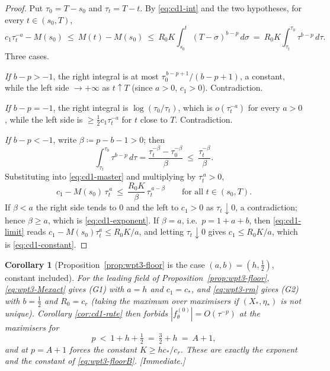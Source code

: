 \documentclass[11pt]{article}
\newtheorem{corollary}[theorem]{Corollary}
\theoremstyle{definition}
\theoremstyle{remark}
\newcommand{\abs}[1]{\left|#1\right|}
\begin{document}
\begin{proof}
  Put $\tau_0=T-s_0$ and $\tau_t=T-t$. By \eqref{eq:cd1-int} and the two
  hypotheses, for every $t\in(s_0,T)$,
  \begin{equation}\label{eq:cd1-master}
    c_1\tau_t^{-a}-M(s_0)\ \leq\ M(t)-M(s_0)
      \ \leq\ R_0K\int_{s_0}^{t}(T-\sigma)^{b-p}\,d\sigma
      \ =\ R_0K\int_{\tau_t}^{\tau_0}\tau^{b-p}\,d\tau .
  \end{equation}
  Three cases.

  \emph{If $b-p>-1$}, the right integral is at most
  $\tau_0^{\,b-p+1}/(b-p+1)$, a constant, while the left side
  $\to+\infty$ as $t\uparrow T$ (since $a>0$, $c_1>0$). Contradiction.

  \emph{If $b-p=-1$}, the right integral is
  $\log(\tau_0/\tau_t)$, which is $o(\tau_t^{-a})$ for every $a>0$, while the
  left side is $\geq\tfrac12c_1\tau_t^{-a}$ for $t$ close to $T$.
  Contradiction.

  \emph{If $b-p<-1$}, write $\beta\coloneqq p-b-1>0$; then
  \[
    \int_{\tau_t}^{\tau_0}\tau^{b-p}\,d\tau
      =\frac{\tau_t^{-\beta}-\tau_0^{-\beta}}{\beta}
      \ \leq\ \frac{\tau_t^{-\beta}}{\beta}.
  \]
  Substituting into \eqref{eq:cd1-master} and multiplying by
  $\tau_t^{\,a}>0$,
  \begin{equation}\label{eq:cd1-limit}
    c_1-M(s_0)\,\tau_t^{\,a}\ \leq\ \frac{R_0K}{\beta}\,\tau_t^{\,a-\beta}
    \qquad\text{for all }t\in(s_0,T).
  \end{equation}
  If $\beta<a$ the right side tends to $0$ and the left to $c_1>0$ as
  $\tau_t\downarrow0$, a contradiction; hence $\beta\geq a$, which is
  \eqref{eq:cd1-exponent}. If $\beta=a$, i.e.\ $p=1+a+b$, then
  \eqref{eq:cd1-limit} reads $c_1-M(s_0)\tau_t^{a}\leq R_0K/a$, and letting
  $\tau_t\downarrow0$ gives $c_1\leq R_0K/a$, which is
  \eqref{eq:cd1-constant}.
\end{proof}

\begin{corollary}[Proposition~\ref{prop:wpt3-floor} is the case
  $(a,b)=(h,\tfrac12)$, constant included]\label{cor:cd1-recovers}
  For the leading field of Proposition~\ref{prop:wpt3-floor},
  \eqref{eq:wpt3-Mexact} gives (G1) with $a=h$ and $c_1=c_*$, and
  \eqref{eq:wpt3-rm} gives (G2) with $b=\tfrac12$ and $R_0=c_r$ (taking the
  maximum over maximisers if $(X_*,\eta_*)$ is not unique). Corollary
  \ref{cor:cd1-rate} then forbids $\abs{f^{(0)}_\theta}=O(\tau^{-p})$ at the
  maximisers for
  \[
    p\ <\ 1+h+\tfrac12\ =\ \tfrac32+h\ =\ A+1 ,
  \]
  and at $p=A+1$ forces the constant $K\geq hc_*/c_r$. These are exactly the
  exponent and the constant of \eqref{eq:wpt3-floorB}. \emph{[Immediate.]}
\end{corollary}
\end{document}
